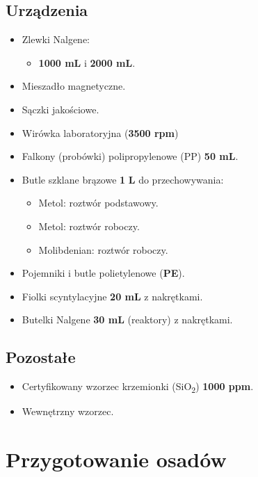 \documentclass[
  letterpaper,
  DIV=11,
  numbers=noendperiod]{scrreprt}
\providecommand{\tightlist}{%
  \setlength{\itemsep}{0pt}\setlength{\parskip}{0pt}}\usepackage{longtable,booktabs,array}
\begin{document}
\hypertarget{urzux105dzenia}{%
\subsection{Urządzenia}\label{urzux105dzenia}}

\begin{itemize}
\tightlist
\item
  Zlewki Nalgene:

  \begin{itemize}
  \tightlist
  \item
    \textbf{1000 mL} i \textbf{2000 mL}.
  \end{itemize}
\item
  Mieszadło magnetyczne.
\item
  Sączki jakościowe.
\item
  Wirówka laboratoryjna (\textbf{3500 rpm})
\item
  Falkony (probówki) polipropylenowe (PP) \textbf{50 mL}.
\item
  Butle szklane brązowe \textbf{1} \textbf{L} do przechowywania:

  \begin{itemize}
  \item
    Metol: roztwór podstawowy.
  \item
    Metol: roztwór roboczy.
  \item
    Molibdenian: roztwór roboczy.
  \end{itemize}
\item
  Pojemniki i butle polietylenowe (\textbf{PE}).
\item
  Fiolki scyntylacyjne \textbf{20 mL} z nakrętkami.
\item
  Butelki Nalgene \textbf{30 mL} (reaktory) z nakrętkami.
\end{itemize}

\hypertarget{pozostaux142e}{%
\subsection{Pozostałe}\label{pozostaux142e}}

\begin{itemize}
\tightlist
\item
  Certyfikowany wzorzec krzemionki (SiO\textsubscript{2}) \textbf{1000
  ppm}.
\item
  Wewnętrzny wzorzec.
\end{itemize}

\hypertarget{przygotowanie-osaduxf3w}{%
\section{Przygotowanie osadów}\label{przygotowanie-osaduxf3w}}
\end{document}
